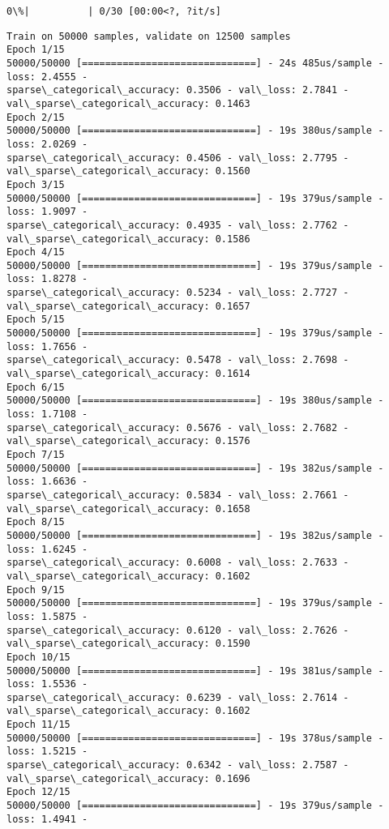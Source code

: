 \documentclass[11pt]{article}
\begin{document}
    \begin{Verbatim}[commandchars=\\\{\}]
  0\%|          | 0/30 [00:00<?, ?it/s]
    \end{Verbatim}

    \begin{Verbatim}[commandchars=\\\{\}]
Train on 50000 samples, validate on 12500 samples
Epoch 1/15
50000/50000 [==============================] - 24s 485us/sample - loss: 2.4555 -
sparse\_categorical\_accuracy: 0.3506 - val\_loss: 2.7841 -
val\_sparse\_categorical\_accuracy: 0.1463
Epoch 2/15
50000/50000 [==============================] - 19s 380us/sample - loss: 2.0269 -
sparse\_categorical\_accuracy: 0.4506 - val\_loss: 2.7795 -
val\_sparse\_categorical\_accuracy: 0.1560
Epoch 3/15
50000/50000 [==============================] - 19s 379us/sample - loss: 1.9097 -
sparse\_categorical\_accuracy: 0.4935 - val\_loss: 2.7762 -
val\_sparse\_categorical\_accuracy: 0.1586
Epoch 4/15
50000/50000 [==============================] - 19s 379us/sample - loss: 1.8278 -
sparse\_categorical\_accuracy: 0.5234 - val\_loss: 2.7727 -
val\_sparse\_categorical\_accuracy: 0.1657
Epoch 5/15
50000/50000 [==============================] - 19s 379us/sample - loss: 1.7656 -
sparse\_categorical\_accuracy: 0.5478 - val\_loss: 2.7698 -
val\_sparse\_categorical\_accuracy: 0.1614
Epoch 6/15
50000/50000 [==============================] - 19s 380us/sample - loss: 1.7108 -
sparse\_categorical\_accuracy: 0.5676 - val\_loss: 2.7682 -
val\_sparse\_categorical\_accuracy: 0.1576
Epoch 7/15
50000/50000 [==============================] - 19s 382us/sample - loss: 1.6636 -
sparse\_categorical\_accuracy: 0.5834 - val\_loss: 2.7661 -
val\_sparse\_categorical\_accuracy: 0.1658
Epoch 8/15
50000/50000 [==============================] - 19s 382us/sample - loss: 1.6245 -
sparse\_categorical\_accuracy: 0.6008 - val\_loss: 2.7633 -
val\_sparse\_categorical\_accuracy: 0.1602
Epoch 9/15
50000/50000 [==============================] - 19s 379us/sample - loss: 1.5875 -
sparse\_categorical\_accuracy: 0.6120 - val\_loss: 2.7626 -
val\_sparse\_categorical\_accuracy: 0.1590
Epoch 10/15
50000/50000 [==============================] - 19s 381us/sample - loss: 1.5536 -
sparse\_categorical\_accuracy: 0.6239 - val\_loss: 2.7614 -
val\_sparse\_categorical\_accuracy: 0.1602
Epoch 11/15
50000/50000 [==============================] - 19s 378us/sample - loss: 1.5215 -
sparse\_categorical\_accuracy: 0.6342 - val\_loss: 2.7587 -
val\_sparse\_categorical\_accuracy: 0.1696
Epoch 12/15
50000/50000 [==============================] - 19s 379us/sample - loss: 1.4941 -

\end{Verbatim}
\end{document}
